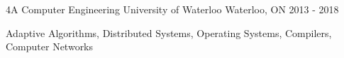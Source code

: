 

\begin{cventries}

  \cventry
    {4A Computer Engineering} %
    {University of Waterloo} %
    {Waterloo, ON} %
    {2013 - 2018} %
    {
      \begin{cvitems} %
      \item {Adaptive Algorithms, Distributed Systems, Operating Systems, Compilers, Computer Networks}
      \end{cvitems}
    }

\end{cventries}
